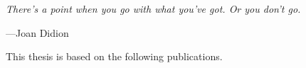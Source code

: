 \documentclass[10pt]{book}
\newcommand{\PaperItitle}{The Strong Screening Rule for SLOPE}
\begin{document}

\pagestyle{empty}




\newpage
\thispagestyle{empty} %

\setlength\epigraphrule{0pt}
\setlength{}

\null
\vspace{20ex}


\epigraph{\itshape
  There’s a point when you go with what you’ve got. Or you don’t go.
}{
  ---Joan Didion
}

\cleardoublepage

\pagestyle{headings}

\setcounter{page}{1} %
\setcounter{tocdepth}{1}

\tableofcontents
{}


\newpage


\newpage



\label{sec:paperlist}

This thesis is based on the following publications.

\end{document}

